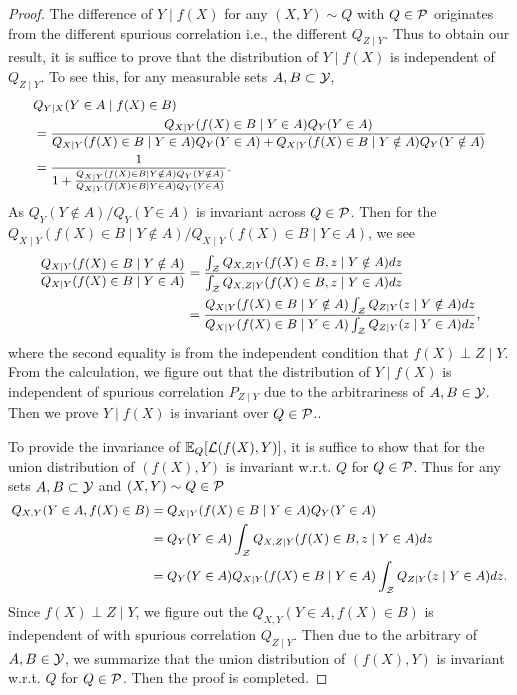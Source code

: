 \begin{proof}
 	The difference of $Y\mid f(X)$ for any $(X, Y)\sim Q$ with $Q\in \mathcal{P}$ originates from the different spurious correlation i.e., the different $Q_{Z\mid Y}$. Thus to obtain our result, it is suffice to prove that the distribution of $Y\mid f(X)$ is independent of $Q_{Z\mid Y}$. To see this, for any measurable sets $A, B\subset \mathcal{Y}$, 
	\begin{equation}
		\small
		\begin{aligned}
			& Q_{Y\mid X}(Y\in A\mid f(X)\in B) \\
			& = \frac{Q_{X\mid Y}(f(X)\in B\mid Y\in A)Q_{Y}(Y\in A)}{Q_{X\mid Y}(f(X)\in B\mid Y\in A)Q_{Y}(Y\in A) + Q_{X\mid Y}(f(X)\in B\mid Y\notin A)Q_{Y}(Y\notin A)} \\
			& = \frac{1}{1 + \frac{Q_{X\mid Y}(f(X)\in B\mid Y\notin A)Q_{Y}(Y\notin A)}{Q_{X\mid Y}(f(X)\in B\mid Y\in A)Q_{Y}(Y\in A)}}. 
		\end{aligned}
	\end{equation}
	As $Q_{Y}(Y\notin A)/Q_{Y}(Y\in A)$ is invariant across $Q\in \mathcal{P}$. Then for the $Q_{X\mid Y}(f(X)\in B\mid Y\notin A) / Q_{X\mid Y}(f(X)\in B\mid Y\in A)$, we see 
	\begin{equation}
		\small
		\begin{aligned}
			\frac{Q_{X\mid Y}(f(X)\in B\mid Y\notin A)}{Q_{X\mid Y}(f(X)\in B\mid Y\in A)} & = \frac{\int_{\cZ} Q_{X, Z\mid Y}(f(X)\in B, z\mid Y\notin A)dz}{\int_{\cZ} Q_{X, Z\mid Y}(f(X)\in B, z\mid Y \in A)dz} \\
			& = \frac{Q_{X\mid Y}(f(X)\in B\mid Y\notin A)\int_{\cZ} Q_{Z\mid Y}(z\mid Y\notin A)dz}{Q_{X\mid Y}(f(X)\in B\mid Y\in A)\int_{\cZ} Q_{Z\mid Y}(z\mid Y\in A)dz},
		\end{aligned}
	\end{equation}
	where the second equality is from the independent condition that $f(X)\perp Z\mid Y$. From the calculation, we figure out that the distribution of $Y\mid f(X)$ is independent of spurious correlation $P_{Z \mid Y}$ due to the arbitrariness of $A, B\in \mathcal{Y}$. Then we prove $Y\mid f(X)$ is invariant over $Q\in \mathcal{P}$.. 
	\par
	To provide the invariance of $\mathbb{E}_{Q}[\mathcal{L}(f(X), Y)]$, it is suffice to show that for the union distribution of $(f(X), Y)$ is invariant w.r.t. $Q$ for $Q\in \mathcal{P}$. Thus for any sets $A, B\subset \mathcal{Y}$ and $(X, Y)\sim Q\in \mathcal{P}$ 
	\begin{equation}
		\small
		\begin{aligned}
			Q_{X, Y}(Y\in A, f(X)\in B) & = Q_{X\mid Y}(f(X)\in B\mid Y\in A)Q_{Y}(Y\in A) \\
			& = Q_{Y}(Y\in A)\int_{\cZ} Q_{X, Z\mid Y}(f(X)\in B, z\mid Y\in A)dz \\
			& = Q_{Y}(Y\in A)Q_{X\mid Y}(f(X)\in B\mid Y\in A)\int_{\cZ}Q_{Z\mid Y}(z\mid Y\in A) dz.
		\end{aligned}
	\end{equation}
	Since $f(X)\perp Z\mid Y$, we figure out the $Q_{X, Y}(Y\in A, f(X)\in B)$ is independent of with spurious correlation $Q_{Z \mid Y}$. Then due to the arbitrary of $A, B\in \mathcal{Y}$, we summarize that the union distribution of $(f(X), Y)$ is invariant w.r.t. $Q$ for $Q\in \mathcal{P}$. Then the proof is completed. 
\end{proof}

